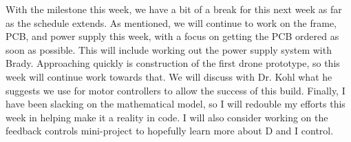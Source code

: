 \documentclass[12pt, titlepage]{article}
\begin{document}
With the milestone this week, we have a bit of a break for this next week as far as the schedule extends. As mentioned, we will continue to work on the frame, PCB, and power supply this week, with a focus on getting the PCB ordered as soon as possible. This will include working out the power supply system with Brady. Approaching quickly is construction of the first drone prototype, so this week will continue work towards that. We will discuss with Dr. Kohl what he suggests we use for motor controllers to allow the success of this build. Finally, I have been slacking on the mathematical model, so I will redouble my efforts this week in helping make it a reality in code. I will also consider working on the feedback controls mini-project to hopefully learn more about D and I control.
\end{document}

